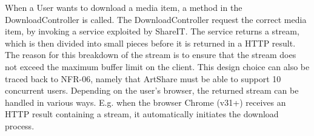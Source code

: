 \documentclass[../report.tex]{subfiles}
\begin{document}
When a User wants to download a media item, a method in the DownloadController is called. The DownloadController request the correct media item, by invoking a service exploited by ShareIT. The service returns a stream, which is then divided into small pieces before it is returned in a HTTP result. The reason for this breakdown of the stream is to ensure that the stream does not exceed the maximum buffer limit on the client. This design choice can also be traced back to NFR-06, namely that ArtShare must be able to support 10 concurrent users. Depending on the user's browser, the returned stream can be handled in various ways. E.g. when the browser Chrome (v31+) receives an HTTP result containing a stream, it automatically initiates the download process.
\end{document}
